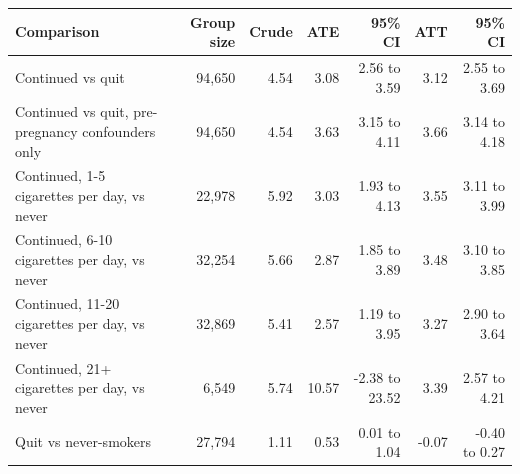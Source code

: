 {\small
\begin{tabular}{lrrrrrr}
\toprule
Comparison & Group size & Crude & ATE & 95\% CI & ATT & 95\% CI \\
\midrule
Continued vs quit & 94,650 & 4.54 & 3.08 & 2.56 to 3.59 & 3.12 & 2.55 to 3.69 \\
Continued vs quit, pre-pregnancy confounders only & 94,650 & 4.54 & 3.63 & 3.15 to 4.11 & 3.66 & 3.14 to 4.18 \\
Continued, 1-5 cigarettes per day, vs never & 22,978 & 5.92 & 3.03 & 1.93 to 4.13 & 3.55 & 3.11 to 3.99 \\
Continued, 6-10 cigarettes per day, vs never & 32,254 & 5.66 & 2.87 & 1.85 to 3.89 & 3.48 & 3.10 to 3.85 \\
Continued, 11-20 cigarettes per day, vs never & 32,869 & 5.41 & 2.57 & 1.19 to 3.95 & 3.27 & 2.90 to 3.64 \\
Continued, 21+ cigarettes per day, vs never & 6,549 & 5.74 & 10.57 & -2.38 to 23.52 & 3.39 & 2.57 to 4.21 \\
Quit vs never-smokers & 27,794 & 1.11 & 0.53 & 0.01 to 1.04 & -0.07 & -0.40 to 0.27 \\
\bottomrule
\end{tabular}
}
